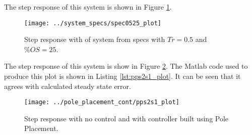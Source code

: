\documentclass{article}
\newcommand{\sincludepdf}[2][]{
	
}
\begin{document}
\sincludepdf[pages={3},
			pagecommand=\subsection*{Example 1}\label{sfs:ex1},
		]{scan/11221301.pdf}

The step response of this system is shown in Figure \ref{fig:spec0525_plot}.
\begin{figure}[h!]
\begin{center}
\texttt{[image: ../system\_specs/spec0525\_plot]}
\end{center}
\caption{Step response with of system from specs with $Tr = 0.5$
	and $\%OS = 25$.}
\label{fig:spec0525_plot}
\end{figure}


\sincludepdf[pages={3},
		pagecommand=\section{Final Value Theorem}
		]{scan/11241301.pdf}

\sincludepdf[pages={2},
	pagecommand=\section{Pole Placement (S-Domain)}\label{sec:pp}\subsection*{Example 1}\label{sec:pp:ex1}
	]{scan/11231301.pdf}
\sincludepdf[pages={3}]{scan/11231301.pdf}

\sincludepdf[pages={5}]{scan/11241301.pdf}

The step response of this system is show in Figure \ref{fig:pps2s1_plot}.
The Matlab code used to produce this plot is shown
in Listing \ref{lst:pps2s1_plot}.
It can be seen that it agrees with calculated steady state error.

\begin{figure}[h!]
\begin{center}
\texttt{[image: ../pole\_placement\_cont/pps2s1\_plot]}
\end{center}
\caption{Step response with no control and with controller
built using Pole Placement.}
\label{fig:pps2s1_plot}
\end{figure}

\clearpage

\end{document}

